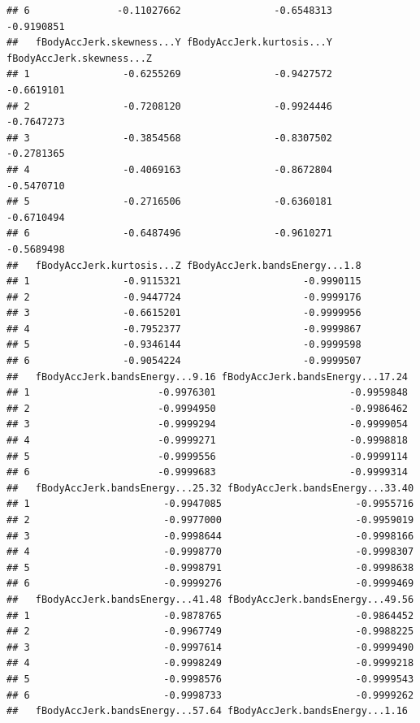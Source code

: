 \documentclass[
]{article}
\begin{document}
\begin{verbatim}
## 6               -0.11027662                -0.6548313                -0.9190851
##   fBodyAccJerk.skewness...Y fBodyAccJerk.kurtosis...Y fBodyAccJerk.skewness...Z
## 1                -0.6255269                -0.9427572                -0.6619101
## 2                -0.7208120                -0.9924446                -0.7647273
## 3                -0.3854568                -0.8307502                -0.2781365
## 4                -0.4069163                -0.8672804                -0.5470710
## 5                -0.2716506                -0.6360181                -0.6710494
## 6                -0.6487496                -0.9610271                -0.5689498
##   fBodyAccJerk.kurtosis...Z fBodyAccJerk.bandsEnergy...1.8
## 1                -0.9115321                     -0.9990115
## 2                -0.9447724                     -0.9999176
## 3                -0.6615201                     -0.9999956
## 4                -0.7952377                     -0.9999867
## 5                -0.9346144                     -0.9999598
## 6                -0.9054224                     -0.9999507
##   fBodyAccJerk.bandsEnergy...9.16 fBodyAccJerk.bandsEnergy...17.24
## 1                      -0.9976301                       -0.9959848
## 2                      -0.9994950                       -0.9986462
## 3                      -0.9999294                       -0.9999054
## 4                      -0.9999271                       -0.9998818
## 5                      -0.9999556                       -0.9999114
## 6                      -0.9999683                       -0.9999314
##   fBodyAccJerk.bandsEnergy...25.32 fBodyAccJerk.bandsEnergy...33.40
## 1                       -0.9947085                       -0.9955716
## 2                       -0.9977000                       -0.9959019
## 3                       -0.9998644                       -0.9998166
## 4                       -0.9998770                       -0.9998307
## 5                       -0.9998791                       -0.9998638
## 6                       -0.9999276                       -0.9999469
##   fBodyAccJerk.bandsEnergy...41.48 fBodyAccJerk.bandsEnergy...49.56
## 1                       -0.9878765                       -0.9864452
## 2                       -0.9967749                       -0.9988225
## 3                       -0.9997614                       -0.9999490
## 4                       -0.9998249                       -0.9999218
## 5                       -0.9998576                       -0.9999543
## 6                       -0.9998733                       -0.9999262
##   fBodyAccJerk.bandsEnergy...57.64 fBodyAccJerk.bandsEnergy...1.16

\end{verbatim}
\end{document}
